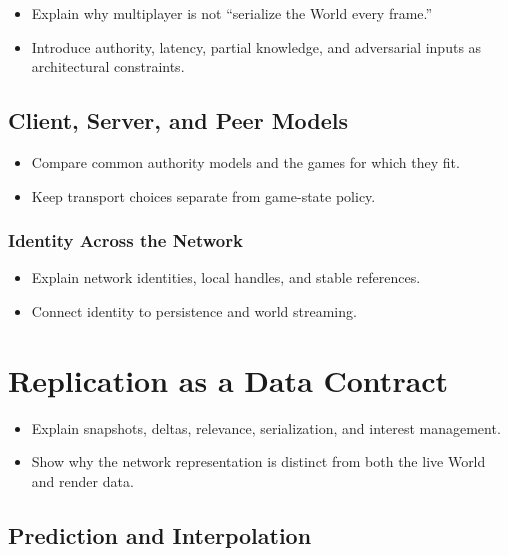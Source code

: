 \documentclass[
  11pt,
  letterpaper,
  DIV=11,
  numbers=noendperiod,
  twoside,
  open=right]{scrreprt}
\providecommand{\tightlist}{%
  \setlength{\itemsep}{0pt}\setlength{\parskip}{0pt}}
\begin{document}
\begin{itemize}
\tightlist
\item
  Explain why multiplayer is not ``serialize the World every frame.''
\item
  Introduce authority, latency, partial knowledge, and adversarial
  inputs as architectural constraints.
\end{itemize}

\subsection{Client, Server, and Peer
Models}\label{client-server-and-peer-models}

\begin{itemize}
\tightlist
\item
  Compare common authority models and the games for which they fit.
\item
  Keep transport choices separate from game-state policy.
\end{itemize}

\subsubsection{Identity Across the
Network}\label{identity-across-the-network}

\begin{itemize}
\tightlist
\item
  Explain network identities, local handles, and stable references.
\item
  Connect identity to persistence and world streaming.
\end{itemize}

\section{Replication as a Data
Contract}\label{replication-as-a-data-contract}

\begin{itemize}
\tightlist
\item
  Explain snapshots, deltas, relevance, serialization, and interest
  management.
\item
  Show why the network representation is distinct from both the live
  World and render data.
\end{itemize}

\subsection{Prediction and
Interpolation}\label{prediction-and-interpolation}
\end{document}
